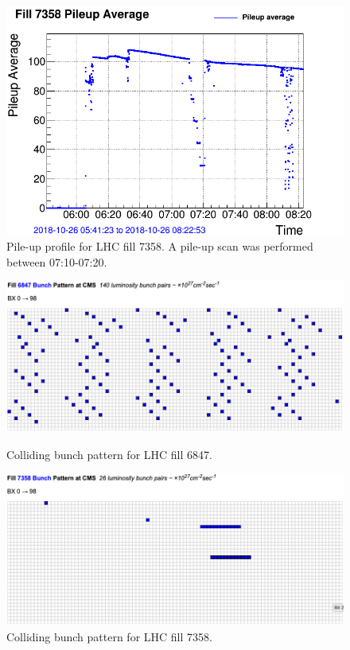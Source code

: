 \begin{figure}[hbt]
  \begin{center}
    \includegraphics[width=0.55\linewidth]{plots/fill_7358_pileup_avg.png}
    \caption{
      Pile-up profile for LHC fill 7358. A pile-up scan was performed between  07:10-07:20.
      \label{fig:fillpu7358}
    }
  \end{center}
\end{figure}

\clearpage
\begin{figure}[hbt]
  \begin{center}

    \includegraphics[width=0.99\linewidth]{plots/fillpattern_6847.png}
    \caption{
      Colliding bunch pattern for LHC fill 6847. 
    \label{fig:fill6847pattern}
    }

    \vspace{12pt}
    
    \includegraphics[width=0.99\linewidth]{plots/fillpattern_7358.png}
    \caption{
      Colliding bunch pattern for LHC fill 7358. 
    \label{fig:fill7358pattern}
    }

  \end{center}
\end{figure}

